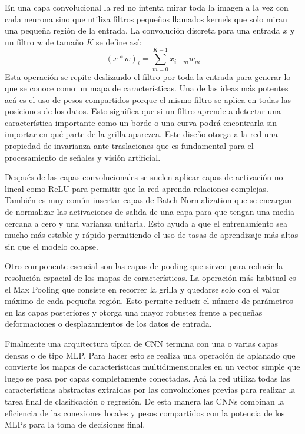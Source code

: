 En una capa convolucional la red no intenta mirar toda la imagen a la vez con cada neurona sino que utiliza filtros pequeños llamados kernels que solo miran una pequeña región de la entrada. La convolución discreta para una entrada $x$ y un filtro $w$ de tamaño $K$ se define así:
\begin{equation}
    (x * w)_i = \sum_{m=0}^{K-1} x_{i+m} w_m
\end{equation}
Esta operación se repite deslizando el filtro por toda la entrada para generar lo que se conoce como un mapa de características. Una de las ideas más potentes acá es el uso de pesos compartidos porque el mismo filtro se aplica en todas las posiciones de los datos. Esto significa que si un filtro aprende a detectar una característica importante como un borde o una curva podrá encontrarla sin importar en qué parte de la grilla aparezca. Este diseño otorga a la red una propiedad de invarianza ante traslaciones que es fundamental para el procesamiento de señales y visión artificial.

Después de las capas convolucionales se suelen aplicar capas de activación no lineal como ReLU para permitir que la red aprenda relaciones complejas. También es muy común insertar capas de Batch Normalization que se encargan de normalizar las activaciones de salida de una capa para que tengan una media cercana a cero y una varianza unitaria. Esto ayuda a que el entrenamiento sea mucho más estable y rápido permitiendo el uso de tasas de aprendizaje más altas sin que el modelo colapse.

Otro componente esencial son las capas de pooling que sirven para reducir la resolución espacial de los mapas de características. La operación más habitual es el Max Pooling que consiste en recorrer la grilla y quedarse solo con el valor máximo de cada pequeña región. Esto permite reducir el número de parámetros en las capas posteriores y otorga una mayor robustez frente a pequeñas deformaciones o desplazamientos de los datos de entrada.

Finalmente una arquitectura típica de CNN termina con una o varias capas densas o de tipo MLP. Para hacer esto se realiza una operación de aplanado que convierte los mapas de características multidimensionales en un vector simple que luego se pasa por capas completamente conectadas. Acá la red utiliza todas las características abstractas extraídas por las convoluciones previas para realizar la tarea final de clasificación o regresión. De esta manera las CNNs combinan la eficiencia de las conexiones locales y pesos compartidos con la potencia de los MLPs para la toma de decisiones final.


